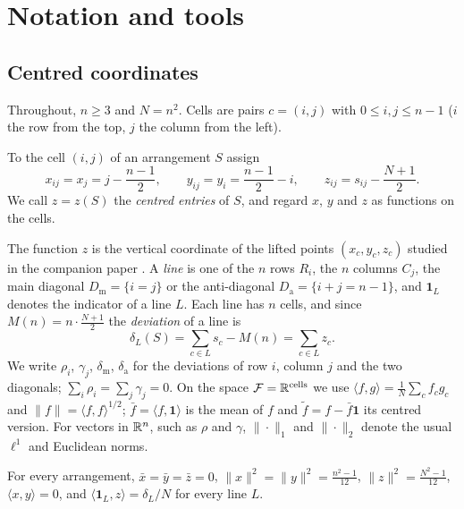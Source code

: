 \section{Notation and tools}
\label{sec:background}

\subsection{Centred coordinates}
\label{sec:bg_coords}

Throughout, $n\ge3$ and $N=n^2$.  Cells are pairs $c=(i,j)$ with $0\le i,j\le n-1$ ($i$ the row from the top, $j$ the column from the left).

\begin{definition}
\label{def:coords}
To the cell $(i,j)$ of an arrangement $S$ assign
\begin{equation}
x_{ij}=x_j=j-\frac{n-1}{2},\qquad y_{ij}=y_i=\frac{n-1}{2}-i,\qquad z_{ij}=s_{ij}-\frac{N+1}{2}.
\label{eq:coords}
\end{equation}
We call $z=z(S)$ the \emph{centred entries} of $S$, and regard $x$, $y$ and $z$ as functions on the cells.
\end{definition}

The function $z$ is the vertical coordinate of the lifted points $(x_c,y_c,z_c)$ studied in the companion paper \cite{mathewson_gems}.
A \emph{line} is one of the $n$ rows $R_i$, the $n$ columns $C_j$, the main diagonal $D_{\mathrm m}=\{i=j\}$ or the anti-diagonal $D_{\mathrm a}=\{i+j=n-1\}$, and $\mathbf 1_L$ denotes the indicator of a line $L$.
Each line has $n$ cells, and since $M(n)=n\cdot\frac{N+1}2$ the \emph{deviation} of a line is
\begin{equation}
\delta_L(S)=\sum_{c\in L}s_c-M(n)=\sum_{c\in L}z_c .
\label{eq:line_dev}
\end{equation}
We write $\rho_i$, $\gamma_j$, $\delta_{\mathrm m}$, $\delta_{\mathrm a}$ for the deviations of row $i$, column $j$ and the two diagonals; $\sum_i\rho_i=\sum_j\gamma_j=0$.
On the space $\mathcal F=\mathbb{R}^{\text{cells}}$ we use $\langle f,g\rangle=\frac1N\sum_cf_cg_c$ and $\|f\|=\langle f,f\rangle^{1/2}$; $\bar f=\langle f,\mathbf 1\rangle$ is the mean of $f$ and $\tilde f=f-\bar f\mathbf 1$ its centred version.
For vectors in $\mathbb{R}^n$, such as $\rho$ and $\gamma$, $\|\cdot\|_1$ and $\|\cdot\|_2$ denote the usual $\ell^1$ and Euclidean norms.

\begin{lemma}
\label{lem:variances}
For every arrangement, $\bar x=\bar y=\bar z=0$, $\|x\|^2=\|y\|^2=\frac{n^2-1}{12}$, $\|z\|^2=\frac{N^2-1}{12}$, $\langle x,y\rangle=0$, and $\langle\mathbf 1_L,z\rangle=\delta_L/N$ for every line $L$.
\end{lemma}

